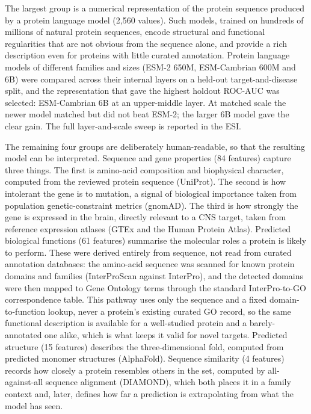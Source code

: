 \documentclass[11pt,twocolumn]{article}
\begin{document}
The largest group is a numerical representation of the protein sequence produced by a protein language model (2,560 values). Such models, trained on hundreds of millions of natural protein sequences, encode structural and functional regularities that are not obvious from the sequence alone, and provide a rich description even for proteins with little curated annotation. Protein language models of different families and sizes (ESM-2 650M,\cite{ref43} ESM-Cambrian 600M and 6B) were compared across their internal layers on a held-out target-and-disease split, and the representation that gave the highest holdout ROC-AUC was selected: ESM-Cambrian 6B at an upper-middle layer. At matched scale the newer model matched but did not beat ESM-2; the larger 6B model gave the clear gain. The full layer-and-scale sweep is reported in the ESI.

The remaining four groups are deliberately human-readable, so that the resulting model can be interpreted. Sequence and gene properties (84 features) capture three things. The first is amino-acid composition and biophysical character, computed from the reviewed protein sequence (UniProt\cite{ref45}). The second is how intolerant the gene is to mutation, a signal of biological importance taken from population genetic-constraint metrics (gnomAD\cite{ref46}). The third is how strongly the gene is expressed in the brain, directly relevant to a CNS target, taken from reference expression atlases (GTEx\cite{ref47} and the Human Protein Atlas\cite{ref48}). Predicted biological functions (61 features) summarise the molecular roles a protein is likely to perform. These were derived entirely from sequence, not read from curated annotation databases: the amino-acid sequence was scanned for known protein domains and families (InterProScan\cite{ref49} against InterPro\cite{ref50}), and the detected domains were then mapped to Gene Ontology\cite{ref51} terms through the standard InterPro-to-GO correspondence table. This pathway uses only the sequence and a fixed domain-to-function lookup, never a protein's existing curated GO record, so the same functional description is available for a well-studied protein and a barely-annotated one alike, which is what keeps it valid for novel targets. Predicted structure (15 features) describes the three-dimensional fold, computed from predicted monomer structures (AlphaFold\cite{ref52}). Sequence similarity (4 features) records how closely a protein resembles others in the set, computed by all-against-all sequence alignment (DIAMOND\cite{ref53}), which both places it in a family context and, later, defines how far a prediction is extrapolating from what the model has seen.
\end{document}
